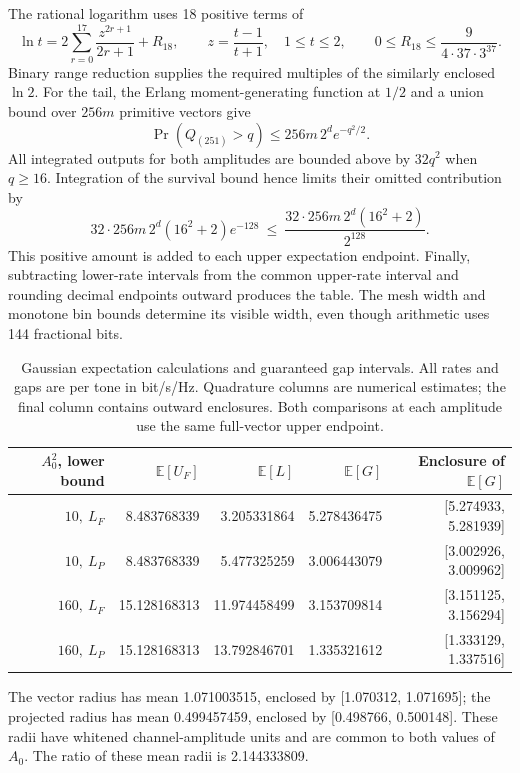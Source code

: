 \documentclass[10pt,letterpaper]{article}
\begin{document}
The rational logarithm uses 18 positive terms of
\[
 \ln t=2\sum_{r=0}^{17}\frac{z^{2r+1}}{2r+1}+R_{18},
 \qquad z=\frac{t-1}{t+1},\quad 1\leq t\leq2,
 \qquad
 0\leq R_{18}\leq\frac{9}{4\cdot37\cdot3^{37}}.
\]
Binary range reduction supplies the required multiples of the similarly enclosed \(\ln2\). For the tail, the Erlang moment-generating function at \(1/2\) and a union bound over \(256m\) primitive vectors give
\[
 \Pr(Q_{(251)}>q)\leq256m\,2^d e^{-q^2/2}.
\]
All integrated outputs for both amplitudes are bounded above by \(32q^2\) when \(q\geq16\). Integration of the survival bound hence limits their omitted contribution by
\begin{equation}
 32\cdot256m\,2^d(16^2+2)e^{-128}
 \ \leq\ \frac{32\cdot256m\,2^d(16^2+2)}{2^{128}}.
\end{equation}
This positive amount is added to each upper expectation endpoint. Finally, subtracting lower-rate intervals from the common upper-rate interval and rounding decimal endpoints outward produces the table. The mesh width and monotone bin bounds determine its visible width, even though arithmetic uses 144 fractional bits.

\begin{table}[htbp]
\centering
\small
\caption{Gaussian expectation calculations and guaranteed gap intervals. All rates and gaps are per tone in bit/s/Hz. Quadrature columns are numerical estimates; the final column contains outward enclosures. Both comparisons at each amplitude use the same full-vector upper endpoint.}
\label{supp:table1}
\begin{tabular}{rrrrr}
\hline
\(A_0^2\), lower bound & \(\mathbb E[U_F]\) & \(\mathbb E[L]\) & \(\mathbb E[G]\) & Enclosure of \(\mathbb E[G]\)\\
\hline
\(10,\ L_F\) & 8.483768339 & 3.205331864 & 5.278436475 & [5.274933, 5.281939]\\
\(10,\ L_P\) & 8.483768339 & 5.477325259 & 3.006443079 & [3.002926, 3.009962]\\
\(160,\ L_F\) & 15.128168313 & 11.974458499 & 3.153709814 & [3.151125, 3.156294]\\
\(160,\ L_P\) & 15.128168313 & 13.792846701 & 1.335321612 & [1.333129, 1.337516]\\
\hline
\end{tabular}

\smallskip
\parbox{0.98\linewidth}{\small
The vector radius has mean 1.071003515, enclosed by [1.070312, 1.071695]; the projected radius has mean 0.499457459, enclosed by [0.498766, 0.500148]. These radii have whitened channel-amplitude units and are common to both values of \(A_0\). The ratio of these mean radii is 2.144333809.}
\end{table}
\end{document}
